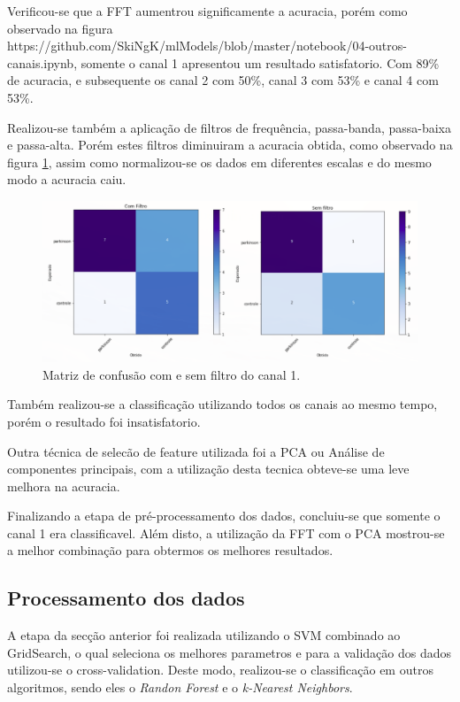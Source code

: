 Verificou-se que a FFT aumentrou significamente a acuracia, porém como observado na figura {https://github.com/SkiNgK/mlModels/blob/master/notebook/04-outros-canais.ipynb}, somente o canal 1 apresentou um resultado satisfatorio. Com 89\% de acuracia, e subsequente os canal 2 com 50\%, canal 3 com 53\% e canal 4 com 53\%.

Realizou-se também a aplicação de filtros de frequência, passa-banda, passa-baixa e passa-alta.  Porém estes filtros diminuiram a acuracia obtida, como observado na figura \ref{comesemfiltro}, assim como normalizou-se os dados em diferentes escalas e do mesmo modo a acuracia caiu.

\begin{figure}[!htb]
	\centering
	\includegraphics[width=1.1\textwidth]{figuras/comesemfiltro.eps}
	\caption{Matriz de confusão com e sem filtro do canal 1.}
	\label{comesemfiltro}
\end{figure}

Também realizou-se a classificação utilizando todos os canais ao mesmo tempo, porém o resultado foi insatisfatorio.

Outra técnica de selecão de feature utilizada foi a PCA ou Análise de componentes principais, com a utilização desta tecnica obteve-se uma leve melhora na acuracia.

Finalizando a etapa de pré-processamento dos dados, concluiu-se que somente o canal 1 era classificavel. Além disto, a utilização da FFT com o PCA mostrou-se a melhor combinação para obtermos os melhores resultados.

\subsection{Processamento dos dados}
A etapa da secção anterior foi realizada utilizando o SVM combinado ao GridSearch, o qual seleciona os melhores parametros e para a validação dos dados utilizou-se o cross-validation. Deste modo, realizou-se o classificação em outros algoritmos, sendo eles o \textit{Randon Forest} e o \textit{k-Nearest Neighbors}.

